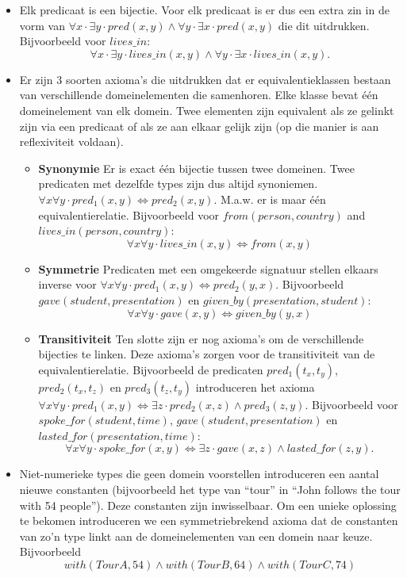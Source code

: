 \begin{itemize}
  \item Elk predicaat is een bijectie. Voor elk predicaat is er dus een extra zin in de vorm van $\forall x \cdot \exists y \cdot pred(x, y) \land \forall y \cdot \exists x \cdot pred(x, y)$ die dit uitdrukken. Bijvoorbeeld voor $lives\_in$: $$\forall x \cdot \exists y \cdot lives\_in(x, y) \land \forall y \cdot \exists x \cdot lives\_in(x, y).$$
  \item Er zijn 3 soorten axioma's die uitdrukken dat er equivalentieklassen bestaan van verschillende domeinelementen die samenhoren. Elke klasse bevat één domeinelement van elk domein. Twee elementen zijn equivalent als ze gelinkt zijn via een predicaat of als ze aan elkaar gelijk zijn (op die manier is aan reflexiviteit voldaan).
    \begin{itemize}
      \item \textbf{Synonymie} Er is exact één bijectie tussen twee domeinen. Twee predicaten met dezelfde types zijn dus altijd synoniemen. $\forall x \forall y \cdot pred_1(x, y) \Leftrightarrow pred_2(x, y)$. M.a.w. er is maar één equivalentierelatie. Bijvoorbeeld voor $from(person, country)$ and $lives\_in(person, country)$: $$\forall x \forall y \cdot lives\_in(x, y) \Leftrightarrow from(x, y)$$
      \item \textbf{Symmetrie} Predicaten met een omgekeerde signatuur stellen elkaars inverse voor $\forall x \forall y \cdot pred_1(x, y) \Leftrightarrow pred_2(y, x)$. Bijvoorbeeld $gave(student, presentation)$ en $given\_by(presentation, student)$: $$\forall x \forall y \cdot gave(x, y) \Leftrightarrow given\_by(y, x)$$
      \item \textbf{Transitiviteit} Ten slotte zijn er nog axioma's om de verschillende bijecties te linken. Deze axioma's zorgen voor de transitiviteit van de equivalentierelatie. Bijvoorbeeld de predicaten $pred_1(t_x, t_y)$, $pred_2(t_x, t_z)$ en $pred_3(t_z, t_y)$ introduceren het axioma $\forall x \forall y \cdot pred_1(x, y) \Leftrightarrow \exists z \cdot pred_2(x, z) \land pred_3(z, y)$. Bijvoorbeeld voor $spoke\_for(student, time)$, $gave(student, presentation)$ en $lasted\_for(presentation, time)$: $$\forall x \forall y \cdot spoke\_for(x, y) \Leftrightarrow \exists z \cdot gave(x, z) \land lasted\_for(z, y).$$
    \end{itemize}
  \item Niet-numerieke types die geen domein voorstellen introduceren een aantal nieuwe constanten (bijvoorbeeld het type van ``tour'' in ``John follows the tour with 54 people''). Deze constanten zijn inwisselbaar. Om een unieke oplossing te bekomen introduceren we een symmetriebrekend axioma dat de constanten van zo'n type linkt aan de domeinelementen van een domein naar keuze. Bijvoorbeeld $$with(TourA, 54) \land with(TourB, 64) \land with(TourC, 74)$$
\end{itemize}

